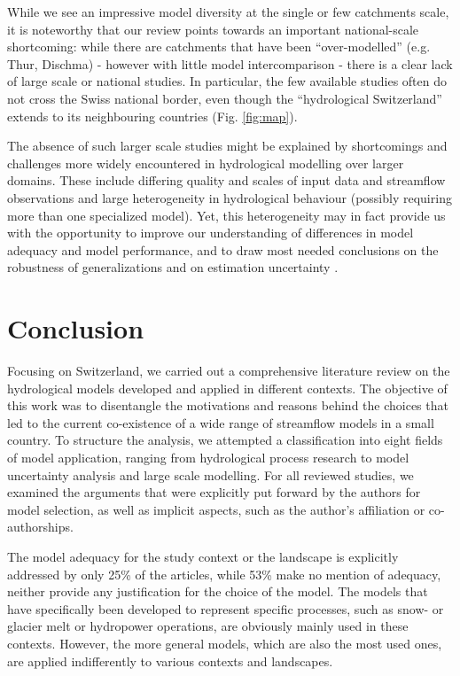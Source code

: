 \documentclass[10pt,a4paper]{article}
\begin{document}
While we see an impressive model diversity at the single or few
catchments scale, it is noteworthy that our review points towards an
important national-scale shortcoming: while there are catchments that
have been ``over-modelled'' (e.g. Thur, Dischma) - however with little
model intercomparison - there is a clear lack of large scale or national
studies. In particular, the few available studies often do not cross the
Swiss national border, even though the ``hydrological Switzerland''
extends to its neighbouring countries
(Fig. \ref{fig:map}).

The absence of such larger scale studies might be explained by
shortcomings and challenges more widely encountered in hydrological
modelling over larger domains. These include differing quality and
scales of input data and streamflow observations and large heterogeneity
in hydrological behaviour (possibly requiring more than one specialized
model). Yet, this heterogeneity may in fact provide us with the
opportunity to improve our understanding of differences in model
adequacy and model performance, and to draw most needed conclusions on
the robustness of generalizations and on estimation
uncertainty \citep{Gupta_2014,McMillan_2016}.


\section{Conclusion}
\label{sec:conclusion}

Focusing on Switzerland, we carried out a comprehensive literature
review on the hydrological models developed and applied in different
contexts. The objective of this work was to disentangle the motivations
and reasons behind the choices that led to the current co-existence of a
wide range of streamflow models in a small country. To structure the
analysis, we attempted a classification into eight fields of model
application, ranging from hydrological process research to model
uncertainty analysis and large scale modelling. For all reviewed
studies, we examined the arguments that were explicitly put forward by
the authors for model selection, as well as implicit aspects, such as
the author's affiliation or co-authorships. 

The model adequacy for the study context or the landscape is explicitly
addressed by only 25\% of the articles, while 53\% make no mention of
adequacy, neither provide any justification for the choice of the model.
The models that have specifically been developed to represent specific
processes, such as snow- or glacier melt or hydropower operations, are
obviously mainly used in these contexts. However, the more general
models, which are also the most used ones, are applied indifferently to
various contexts and landscapes.
\end{document}
